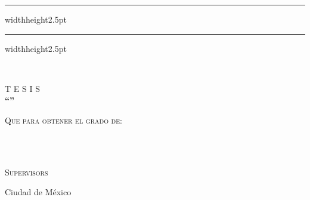 \begin{titlepage}
\begin{adjustbox}{max width=1.2\linewidth, right}
\begin{minipage}[c][0.99\textheight][t]{0.95\textwidth}
\begin{minipage}[t]{0.1\textwidth}
            \end{minipage}
            \hfill
            \begin{minipage}[t]{0.9\textwidth}
                {\color{pantone_222_c} \hrule width\textwidth height2.5pt}
            \end{minipage}
            \begin{minipage}[t]{0.9\textwidth}
                {\color{black_cic} \hrule width\textwidth height2.5pt}
            \end{minipage}
            \begin{minipage}[t]{0.1\textwidth}
            \end{minipage}
            
            \vspace{20pt}
            {\fontsize{16}{16}\selectfont\textsc{\schoolname\\}}

            \vspace{60pt}
            {\fontsize{25}{20}\selectfont T E S I S\\}
            \vspace{60pt}
            {\fontsize{16}{16}\selectfont\textbf{``\thesisname''\\}}

            \vspace{60pt}
            {\fontsize{14}{14}\selectfont\textsc{Que para obtener el grado de:\\}}
            \vspace{10pt}
            {\fontsize{14}{14}\selectfont\textbf{\academicdegree\\}}

            \vspace{60pt}
            \vspace{10pt}
            {\fontsize{14}{14}\selectfont\textbf{\authorname\\}}

            \vspace{60pt}
            {\fontsize{14}{14}\selectfont\textsc{Supervisors\\}}
            \vspace{10pt}
            {\fontsize{14}{14}\selectfont\textbf{\thesisdirectors}}

            \vfill
            {\fontsize{12}{12}\selectfont Ciudad de México\\}
            {\fontsize{12}{12}\selectfont \thesisdate\\}
            \vspace{40pt}
        \end{minipage}
    \end{adjustbox}
\end{titlepage}